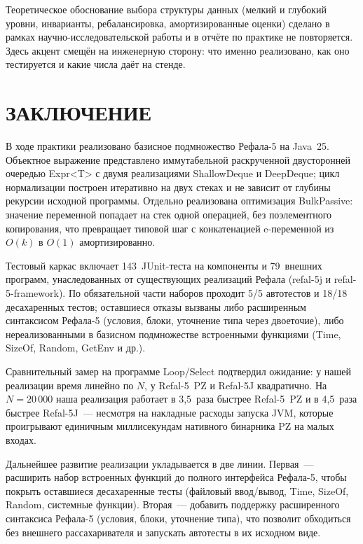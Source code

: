 \documentclass[14pt, russian]{scrartcl}
\newcommand{\prog}[1]{{\ttfamily\small#1}}
\newcommand{\anonsection}[1]{\cleardoublepage
\phantomsection
\addcontentsline{toc}{section}{\protect\numberline{}#1}
\section*{#1}\vspace*{2.5ex}}
\begin{document}
Теоретическое обоснование выбора структуры данных (мелкий и глубокий
уровни, инварианты, ребалансировка, амортизированные оценки) сделано
в рамках научно-исследовательской работы и в отчёте по практике не
повторяется. Здесь акцент смещён на инженерную сторону: что именно
реализовано, как оно тестируется и какие числа даёт на стенде.





\anonsection{ЗАКЛЮЧЕНИЕ}

В ходе практики реализовано базисное подмножество Рефала-5 на Java~25.
Объектное выражение представлено иммутабельной раскрученной двусторонней
очередью \prog{Expr<T>} с двумя реализациями \prog{ShallowDeque} и
\prog{DeepDeque}; цикл нормализации построен итеративно на двух стеках
и не зависит от глубины рекурсии исходной программы. Отдельно
реализована оптимизация \prog{BulkPassive}: значение переменной попадает
на стек одной операцией, без поэлементного копирования, что превращает
типовой шаг с конкатенацией e-переменной из $O(k)$ в $O(1)$
амортизированно.

Тестовый каркас включает 143~JUnit-теста на компоненты и 79~внешних
программ, унаследованных от существующих реализаций Рефала
(\prog{refal-5j} и \prog{refal-5-framework}). По обязательной части
наборов проходит 5/5 автотестов и 18/18 десахаренных тестов;
оставшиеся отказы вызваны либо расширенным синтаксисом Рефала-5
(условия, блоки, уточнение типа через двоеточие), либо
нереализованными в базисном подмножестве встроенными функциями
(\prog{Time}, \prog{SizeOf}, \prog{Random}, \prog{GetEnv} и др.).

Сравнительный замер на программе Loop/Select подтвердил ожидание:
у нашей реализации время линейно по $N$, у Refal-5~PZ и Refal-5J
квадратично. На $N = 20\,000$ наша реализация работает в 3,5~раза
быстрее Refal-5~PZ и в 4,5~раза быстрее Refal-5J~--- несмотря на
накладные расходы запуска JVM, которые проигрывают единичным
миллисекундам нативного бинарника PZ на малых входах.

Дальнейшее развитие реализации укладывается в две линии. Первая~---
расширить набор встроенных функций до полного интерфейса Рефала-5,
чтобы покрыть оставшиеся десахаренные тесты (файловый ввод/вывод,
\prog{Time}, \prog{SizeOf}, \prog{Random}, системные функции).
Вторая~--- добавить поддержку расширенного синтаксиса Рефала-5
(условия, блоки, уточнение типа), что позволит обходиться без
внешнего рассахаривателя и запускать автотесты в их исходном виде.

\clearpage
\printbibliography[heading=bibintoc,title={СПИСОК ИСПОЛЬЗОВАННЫХ ИСТОЧНИКОВ}]


\end{document}
